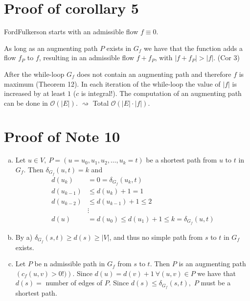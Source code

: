 \documentclass[12pt,oneside,a4paper,parskip=on,fleqn]{scrartcl}
\begin{document}
	\section*{Proof of corollary 5} %
	\label{sec:proof_of_corollary_5}
		FordFulkerson starts with an admissible flow $f\equiv 0$.

		As long as an augmenting path $P$ exists in $G_f$ we have that the function adds a flow $f_P$ to $f$, resulting in an admissible flow $f+f_P$, with $|f+f_P| > |f|.$ (Cor 3)

		After the while-loop $G_f$ does not contain an augmenting path and therefore $f$ is maximum (Theorem 12). In each iteration of the while-loop the value of $|f|$ is increased by at least $1$ ($c$ is integral!). The computation of an augmenting path can be done in $\mathcal{O}(|E|)$. $\rightsquigarrow$ Total $\mathcal{O}(|E| \cdot |f|)$.
	\section*{Proof of Note 10} %
	\label{sec:proof_of_note_10}
	\begin{enumerate}[a)]
		\item Let $u\in V,\ P = (u = u_0, u_1, u_2, \ldots, u_k = t)$ be a shortest path from $u$ to $t$ in $G_f$. Then $\delta_{G_f}(u,t) = k$ and 
		\begin{align*}
			d(u_k) &= 0 = \delta_{G_f}(u_k,t)\\
			d(u_{k-1}) &\leq d(u_k) + 1 = 1\\
			d(u_{k-2}) &\leq d(u_{k-1}) + 1 \leq 2\\
			&\vdots\\
			d(u) &= d(u_0) \leq d(u_1) + 1 \leq k = \delta_{G_f}(u,t)
		\end{align*}
		\item By a) $\delta_{G_f}(s,t) \geq d(s) \geq |V|$, and thus no simple path from $s$ to $t$ in $G_f$ exists.
		\item Let $P$ be n admissible path in $G_f$ from $s$ to $t$. Then $P$ is an augmenting path $\left(c_f(u,v) > 0!)\right)$. Since $d(u) = d(v)+1\ \forall (u,v)\in P$ we have that $d(s) = $ number of edges of $P$. Since $d(s) \leq \delta_{G_f}(s,t),$ $P$ must be a shortest path.
		\end{enumerate}
\end{document}
